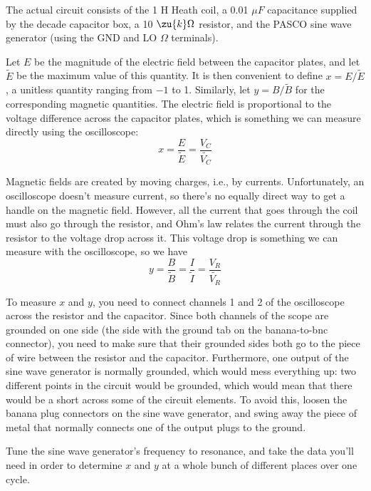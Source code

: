 The actual circuit consists of the 1 H
Heath coil, a 0.01 $\mu F$ capacitance supplied by the
decade capacitor box, a 10 $\zu{k}\Omega$ resistor, and the PASCO sine
wave generator (using the GND and LO $\Omega$ terminals).

\observations
Let $E$ be the magnitude of the electric field between the capacitor plates, and
 let $\tilde{E}$ be the maximum value of this quantity. It is then
 convenient to define
 $x=E/\tilde{E}$, a unitless quantity ranging from $-1$ to 1.
 Similarly, let $y=B/\tilde{B}$ for the corresponding magnetic quantities.
 The electric field is proportional to the voltage difference across
 the capacitor plates, which is something we can measure directly using
 the oscilloscope:
 \begin{equation*}
 	x = \frac{E}{\tilde{E}} = \frac{V_C}{\tilde{V_C}} 
 \end{equation*}

 Magnetic fields are created by moving charges, i.e., by currents.
 Unfortunately, an oscilloscope doesn't measure current, so there's
 no equally direct way to get a handle on the magnetic field. However,
 all the current that goes through the coil must also go through the
 resistor, and Ohm's law relates the current through the resistor to
 the voltage drop across it. This voltage drop is something we can
 measure with the oscilloscope, so we have
 \begin{equation*}
 	y = \frac{B}{\tilde{B}} = \frac{I}{\tilde{I}}= \frac{V_R}{\tilde{V_R}} 
 \end{equation*}
 
 To measure $x$ and $y$, you need to connect channels 1 and 2 of the
 oscilloscope across the resistor and the capacitor. Since both channels
 of the scope are grounded on one side (the side with the ground tab
 on the banana-to-bnc connector), you need to make sure that their
 grounded sides both go to the piece of wire between the resistor and
 the capacitor. Furthermore, one output of the sine wave generator is
 normally grounded, which would mess everything up: two different points
 in the circuit would be grounded, which would mean that there would be
 a short across some of the circuit elements. To avoid this, loosen the
 banana plug connectors on the sine wave generator, and swing away the
 piece of metal that normally connects one of the output plugs to the
 ground.
 
 Tune the sine wave generator's frequency to resonance, and take the
 data you'll need in order to determine $x$ and $y$ at a whole
 bunch of different places over one cycle.

